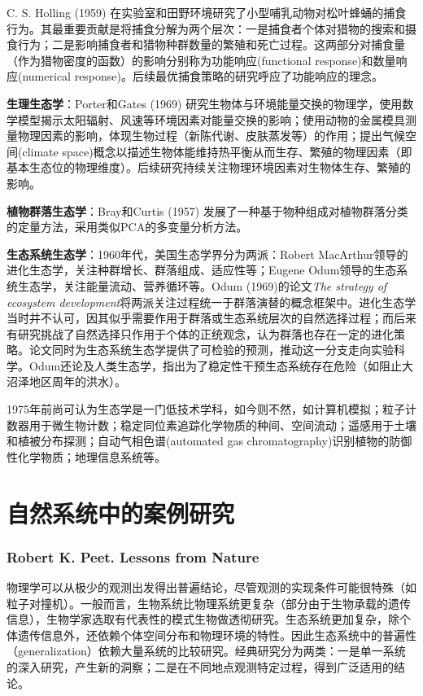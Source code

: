 C. S. Holling (1959) 在实验室和田野环境研究了小型哺乳动物对松叶蜂蛹的捕食行为。其最重要贡献是将捕食分解为两个层次：一是捕食者个体对猎物的搜索和摄食行为；二是影响捕食者和猎物种群数量的繁殖和死亡过程。这两部分对捕食量（作为猎物密度的函数）的影响分别称为功能响应(functional response)和数量响应(numerical response)。后续最优捕食策略的研究呼应了功能响应的理念。

\textbf{生理生态学}：Porter和Gates (1969) 研究生物体与环境能量交换的物理学，使用数学模型揭示太阳辐射、风速等环境因素对能量交换的影响；使用动物的金属模具测量物理因素的影响，体现生物过程（新陈代谢、皮肤蒸发等）的作用；提出气候空间(climate space)概念以描述生物体能维持热平衡从而生存、繁殖的物理因素（即基本生态位的物理维度）。后续研究持续关注物理环境因素对生物体生存、繁殖的影响。

\textbf{植物群落生态学}：Bray和Curtis (1957) 发展了一种基于物种组成对植物群落分类的定量方法，采用类似PCA的多变量分析方法。

\textbf{生态系统生态学}：1960年代，美国生态学界分为两派：Robert MacArthur领导的进化生态学，关注种群增长、群落组成、适应性等；Eugene Odum领导的生态系统生态学，关注能量流动、营养循环等。Odum (1969)的论文\emph{The strategy of ecosystem development}将两派关注过程统一于群落演替的概念框架中。进化生态学当时并不认可，因其似乎需要作用于群落或生态系统层次的自然选择过程；而后来有研究挑战了自然选择只作用于个体的正统观念，认为群落也存在一定的进化策略。论文同时为生态系统生态学提供了可检验的预测，推动这一分支走向实验科学。Odum还论及人类生态学，指出为了稳定性干预生态系统存在危险（如阻止大沼泽地区周年的洪水）。

1975年前尚可认为生态学是一门低技术学科，如今则不然，如计算机模拟；粒子计数器用于微生物计数；稳定同位素追踪化学物质的种间、空间流动；遥感用于土壤和植被分布探测；自动气相色谱(automated gas chromatography)识别植物的防御性化学物质；地理信息系统等。

\section{自然系统中的案例研究}

\subsubsection*{Robert K. Peet. Lessons from Nature}

物理学可以从极少的观测出发得出普遍结论，尽管观测的实现条件可能很特殊（如粒子对撞机）。一般而言，生物系统比物理系统更复杂（部分由于生物承载的遗传信息），生物学家选取有代表性的模式生物做透彻研究。生态系统更加复杂，除个体遗传信息外，还依赖个体空间分布和物理环境的特性。因此生态系统中的普遍性（generalization）依赖大量系统的比较研究。经典研究分为两类：一是单一系统的深入研究，产生新的洞察；二是在不同地点观测特定过程，得到广泛适用的结论。

